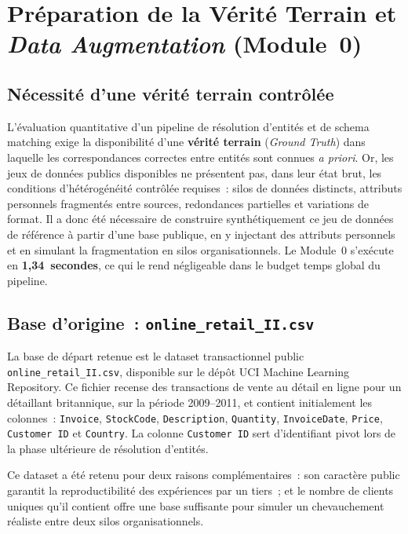 \section{Préparation de la Vérité Terrain et \textit{Data Augmentation}
         (Module~0)}
\label{sec:module0}

\subsection{Nécessité d'une vérité terrain contrôlée}
\label{subsec:gt_necessite}

L'évaluation quantitative d'un pipeline de résolution d'entités et de
schema matching exige la disponibilité d'une \textbf{vérité terrain}
(\textit{Ground Truth}) dans laquelle les correspondances correctes entre
entités sont connues \textit{a priori}. Or, les jeux de données publics
disponibles ne présentent pas, dans leur état brut, les conditions
d'hétérogénéité contrôlée requises~: silos de données distincts,
attributs personnels fragmentés entre sources, redondances partielles
et variations de format. Il a donc été nécessaire de construire
synthétiquement ce jeu de données de référence à partir d'une base
publique, en y injectant des attributs personnels et en simulant la
fragmentation en silos organisationnels. Le Module~0 s'exécute en
\textbf{1,34~secondes}, ce qui le rend négligeable dans le budget
temps global du pipeline.

\subsection{Base d'origine~: \texttt{online\_retail\_II.csv}}
\label{subsec:base_origine}

La base de départ retenue est le dataset transactionnel public
\texttt{online\_retail\_II.csv}, disponible sur le dépôt UCI Machine
Learning Repository. Ce fichier recense des transactions de vente au
détail en ligne pour un détaillant britannique, sur la période
2009--2011, et contient initialement les colonnes~: \texttt{Invoice},
\texttt{StockCode}, \texttt{Description}, \texttt{Quantity},
\texttt{InvoiceDate}, \texttt{Price}, \texttt{Customer~ID} et
\texttt{Country}. La colonne \texttt{Customer~ID} sert d'identifiant
pivot lors de la phase ultérieure de résolution d'entités.

Ce dataset a été retenu pour deux raisons complémentaires~: son
caractère public garantit la reproductibilité des expériences par un
tiers~; et le nombre de clients uniques qu'il contient offre une base
suffisante pour simuler un chevauchement réaliste entre deux silos
organisationnels.

